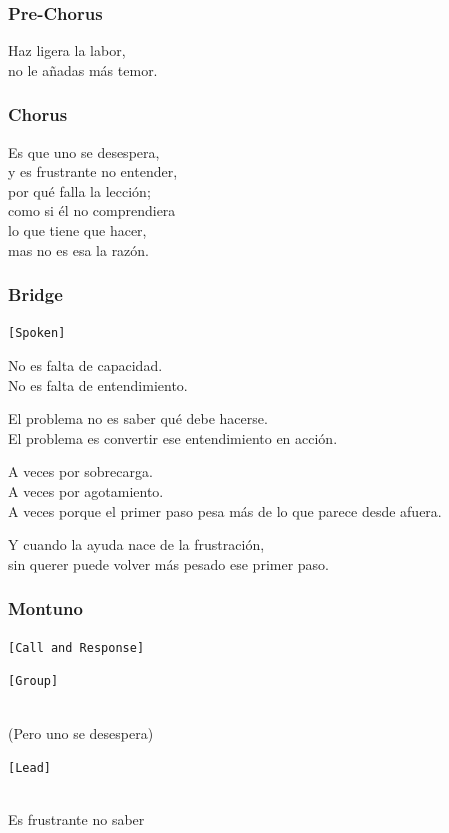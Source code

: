 \subsubsection{Pre-Chorus}\label{pre-chorus-34}

Haz ligera la labor,\\
no le añadas más temor.

\subsubsection{Chorus}\label{chorus-58}

Es que uno se desespera,\\
y es frustrante no entender,\\
por qué falla la lección;\\
como si él no comprendiera\\
lo que tiene que hacer,\\
mas no es esa la razón.

\subsubsection{Bridge}\label{bridge-22}

\texttt{{[}Spoken{]}}

No es falta de capacidad.\\
No es falta de entendimiento.

El problema no es saber qué debe hacerse.\\
El problema es convertir ese entendimiento en acción.

A veces por sobrecarga.\\
A veces por agotamiento.\\
A veces porque el primer paso pesa más de lo que parece desde afuera.

Y cuando la ayuda nace de la frustración,\\
sin querer puede volver más pesado ese primer paso.

\subsubsection{Montuno}\label{montuno-1}

\texttt{{[}Call\ and\ Response{]}}

\texttt{{[}Group{]}}\strut \\
(Pero uno se desespera)

\texttt{{[}Lead{]}}\strut \\
Es frustrante no saber

